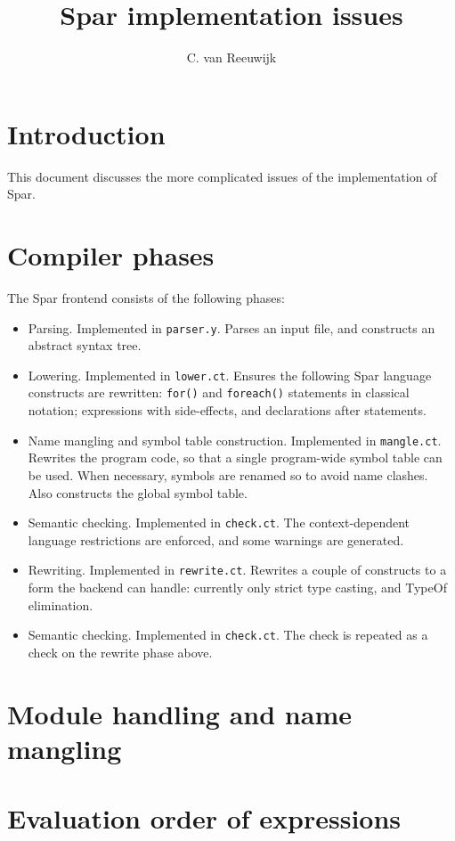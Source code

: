 \documentclass{article}
\title{Spar implementation issues}
\author{C. van Reeuwijk}
\newcommand{\spar}{{\sf Spar}}
\begin{document}
\maketitle
\section{Introduction}
This document discusses the more complicated issues of the implementation
of {\spar}.
\section{Compiler phases}
The {\spar} frontend consists of the following phases:
\begin{itemize}
\item Parsing. Implemented in \verb'parser.y'. Parses an input file,
     and constructs an abstract syntax tree.
\item Lowering. Implemented in \verb'lower.ct'. Ensures the following
      Spar language constructs are rewritten: \verb'for()' and
      \verb'foreach()' statements in classical notation; expressions
      with side-effects, and declarations after statements.
\item Name mangling and symbol table construction. Implemented in
     \verb'mangle.ct'. Rewrites the
      program code, so that a single program-wide symbol table can be used.
      When necessary, symbols are renamed so to avoid name clashes.
      Also constructs the global symbol table.
\item Semantic checking. Implemented in \verb'check.ct'. The context-dependent
      language restrictions are enforced, and some warnings are generated.
\item Rewriting. Implemented in \verb'rewrite.ct'. Rewrites a couple
      of constructs to a form the backend can handle: currently only
      strict type casting, and TypeOf elimination.
\item Semantic checking. Implemented in \verb'check.ct'. The check is
      repeated as a check on the rewrite phase above.
\end{itemize}

\section{Module handling and name mangling}


\section{Evaluation order of expressions}
\end{document}
